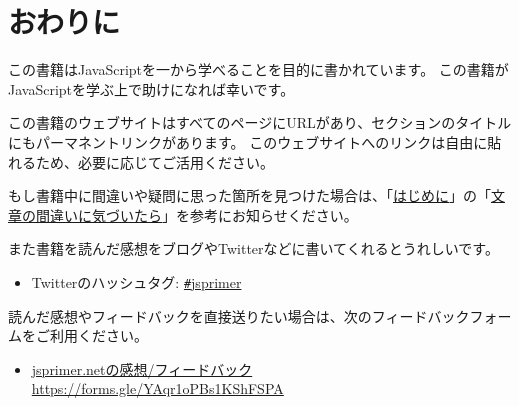 \hypertarget{outro}{%
\chapter*{おわりに}\label{outro}}
\thispagestyle{frontheadings}

この書籍はJavaScriptを一から学べることを目的に書かれています。
この書籍がJavaScriptを学ぶ上で助けになれば幸いです。

この書籍のウェブサイトはすべてのページにURLがあり、セクションのタイトルにもパーマネントリンクがあります。
このウェブサイトへのリンクは自由に貼れるため、必要に応じてご活用ください。

もし書籍中に間違いや疑問に思った箇所を見つけた場合は、「\hyperlink{prolog}{はじめに}」の「\hyperlink{how-to-report-mistake}{文章の間違いに気づいたら}」を参考にお知らせください。

また書籍を読んだ感想をブログやTwitterなどに書いてくれるとうれしいです。

\begin{itemize}
\item
  Twitterのハッシュタグ:
  \href{https://twitter.com/search?f=realtime\&q=\%23jsprimer}{\texttt \#jsprimer}
\end{itemize}

読んだ感想やフィードバックを直接送りたい場合は、次のフィードバックフォームをご利用ください。

\begin{itemize}
\item
  \href{https://forms.gle/YAqr1oPBs1KShFSPA}{jsprimer.netの感想/フィードバック}\\
  \url{https://forms.gle/YAqr1oPBs1KShFSPA}
\end{itemize}
